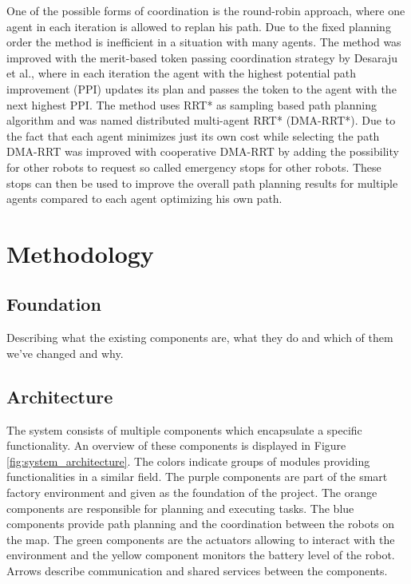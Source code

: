 \documentclass[journal]{IEEEtran}
\begin{document}
One of the possible forms of coordination is the round-robin approach, where one agent in each iteration is allowed to replan his path. Due to the fixed planning order the method is inefficient in a situation with many agents. The method was improved with the merit-based token passing coordination strategy by Desaraju et al.\cite{DMA}, where in each iteration the agent with the highest potential path improvement (PPI) updates its plan and passes the token to the agent with the next highest PPI. The method uses  RRT* as sampling based path planning algorithm and was named distributed multi-agent RRT* (DMA-RRT*). Due to the fact that each agent minimizes just its own cost while selecting the path DMA-RRT was improved with cooperative DMA-RRT\cite{DMA} by adding the possibility for other robots to request so called emergency stops for other robots. These stops can then be used to improve the overall path planning results for multiple agents compared to each agent optimizing his own path.

\section{Methodology}
\label{sec:methodology}

\subsection{Foundation}
\label{subsec:foundation}
Describing what the existing components are, what they do and which of them we've changed and why.

\subsection{Architecture}
\label{subsec:architecture}
The system consists of multiple components which encapsulate a specific functionality. An overview of these components is displayed in Figure \ref{fig:system_architecture}. The colors indicate groups of modules providing functionalities in a similar field. The purple components are part of the smart factory environment and given as the foundation of the project. The orange components are responsible for planning and executing tasks. The blue components provide path planning and the coordination between the robots on the map. The green components are the actuators allowing to interact with the environment and the yellow component monitors the battery level of the robot. Arrows describe communication and shared services between the components.
\end{document}
